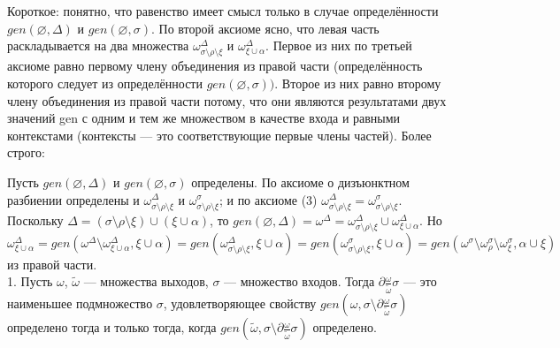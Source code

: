 \begin{comment}
	Можно ввести ещё одну аксиому: значение $gen(\omega, \sigma)$ не определено, если a) $\exists \sigma_1, \sigma_2 \subset \sigma$: $\sigma_1 \cap \sigma_2 = \varnothing$, $\exists \omega_1, \omega_2 \in 2^\Omega$: $gen(\omega_1, s_1) \cap gen(\omega_2, s_2) \neq \varnothing$, или b) $\exists \sigma^\prime \subset \sigma$, $\exists \omega^\prime \in 2^\Omega$: $gen(\omega^\prime, \sigma^\prime) \cap \omega \neq \varnothing$, или c) $\exists s \in \sigma$, $\exists \omega^\prime,\omega^{\prime\prime} \in 2^\Omega$: $d_{\omega^\prime,\omega^{\prime\prime}}(s) \nsubseteq \omega$; иначе оно определено.
\end{comment}

Короткое: понятно, что равенство имеет смысл только в случае определённости $gen(\varnothing, \Delta)$ и $gen(\varnothing, \sigma)$. По второй аксиоме ясно, что левая часть раскладывается на два множества $\omega^\Delta_{\sigma\setminus\rho\setminus\xi}$ и $\omega^\Delta_{\xi\cup\alpha}$. Первое из них по третьей аксиоме равно первому члену объединения из правой части (определённость которого следует из определённости $gen(\varnothing, \sigma))$. Второе из них равно второму члену объединения из правой части потому, что они являются результатами двух значений gen с одним и тем же множеством в качестве входа и равными контекстами (контексты --- это соответствующие первые члены частей). Более строго: 

Пусть $gen(\varnothing, \Delta)$ и $gen(\varnothing, \sigma)$ определены. По аксиоме о дизъюнктном разбиении определены и $\omega^\Delta_{\sigma \setminus \rho \setminus \xi}$ и $\omega^\sigma_{\sigma \setminus \rho \setminus \xi}$; и по аксиоме (3) $\omega^\Delta_{\sigma \setminus \rho \setminus \xi} = \omega^\sigma_{\sigma \setminus \rho \setminus \xi}$. Поскольку $\Delta = (\sigma \setminus \rho \setminus \xi) \cup (\xi \cup \alpha)$, то $gen(\varnothing, \Delta) = \omega^\Delta = \omega^\Delta_{\sigma \setminus \rho \setminus \xi} \cup \omega^\Delta_{\xi \cup \alpha}$. Но $\omega^\Delta_{\xi \cup \alpha} = gen(\omega^\Delta \setminus \omega^\Delta_{\xi \cup \alpha}, \xi \cup \alpha) = gen(\omega^\Delta_{\sigma \setminus \rho \setminus \xi}, \xi \cup \alpha) = gen(\omega^\sigma_{\sigma \setminus \rho \setminus \xi}, \xi \cup \alpha) = gen(\omega^\sigma \setminus \omega^\sigma_\rho \setminus \omega^\sigma_\xi, \alpha\cup\xi)$ из правой части.
\\

1. Пусть $\omega$, $\tilde{\omega}$ --- множества выходов, $\sigma$ --- множество входов.
	Тогда $\partial\frac{\omega}{\tilde{\omega}}\sigma$ --- это наименьшее подмножество $\sigma$, удовлетворяющее свойству $gen(\omega,\sigma\setminus\partial\frac{\omega}{\tilde{\omega}}\sigma)$ определено тогда и только тогда, когда $gen(\tilde{\omega},\sigma\setminus\partial\frac{\omega}{\tilde{\omega}}\sigma)$ определено.
\\

